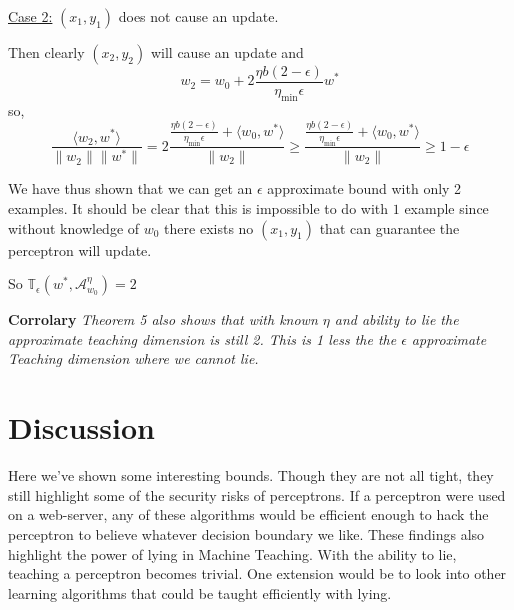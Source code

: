 \documentclass{article}
\newcommand{\learn}{\mathcal{A}_{w_0}^\eta}
\begin{document}
\underline{Case 2:} $(x_1, y_1)$ does not cause an update.

Then clearly $(x_2, y_2)$ will cause an update and
$$
w_2 = w_0 + 2\frac{\eta b(2-\epsilon)}{\eta_{\min} \epsilon}w^* 
$$
so,
$$
\frac{\langle w_2 , w^* \rangle}{\lVert w_2 \rVert \lVert w^* \rVert} = 2\frac{\frac{\eta b(2-\epsilon)}{\eta_{\min} \epsilon} + \langle w_0, w^* \rangle}{\lVert w_2 \rVert} \geq \frac{\frac{\eta b(2-\epsilon)}{\eta_{\min} \epsilon} + \langle w_0, w^* \rangle}{\lVert w_2 \rVert} \geq 1 - \epsilon
$$

We have thus shown that we can get an $\epsilon$ approximate bound with only 2 examples. It should be clear that this is impossible to do with $1$ example since without knowledge of $w_0$ there exists no $(x_1, y_1)$ that can guarantee the perceptron will update.

So 
$
\mathbb{T}_{\epsilon}(w^*, \learn) = 2
$

\textbf{Corrolary}
\textit{
Theorem 5 also shows that with known $\eta$ and ability to lie the approximate teaching dimension is still 2. This is 1 less the the $\epsilon$ approximate Teaching dimension where we cannot lie. \cite{perceptron}
}

\section{Discussion}
Here we've shown some interesting bounds. Though they are not all tight, they
still highlight some of the security risks of perceptrons. If a perceptron were
used on a web-server, any of these algorithms would be efficient enough to hack
the perceptron to believe whatever decision boundary we like. These findings
also highlight the power of lying in Machine Teaching. With the ability to lie,
teaching a perceptron becomes trivial. One extension would be to look into other learning algorithms that could be taught efficiently with lying. 


\small


\end{document}
